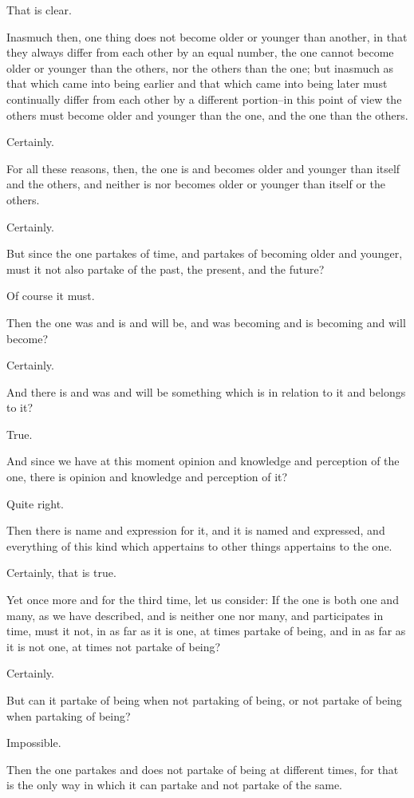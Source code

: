 That is clear.

Inasmuch then, one thing does not become older or younger than another,
in that they always differ from each other by an equal number, the one
cannot become older or younger than the others, nor the others than the
one; but inasmuch as that which came into being earlier and that which
came into being later must continually differ from each other by a
different portion--in this point of view the others must become older
and younger than the one, and the one than the others.

Certainly.

For all these reasons, then, the one is and becomes older and younger
than itself and the others, and neither is nor becomes older or younger
than itself or the others.

Certainly.

But since the one partakes of time, and partakes of becoming older and
younger, must it not also partake of the past, the present, and the
future?

Of course it must.

Then the one was and is and will be, and was becoming and is becoming
and will become?

Certainly.

And there is and was and will be something which is in relation to it
and belongs to it?

True.

And since we have at this moment opinion and knowledge and perception of
the one, there is opinion and knowledge and perception of it?

Quite right.

Then there is name and expression for it, and it is named and expressed,
and everything of this kind which appertains to other things appertains
to the one.

Certainly, that is true.

Yet once more and for the third time, let us consider: If the one is
both one and many, as we have described, and is neither one nor many,
and participates in time, must it not, in as far as it is one, at times
partake of being, and in as far as it is not one, at times not partake
of being?

Certainly.

But can it partake of being when not partaking of being, or not partake
of being when partaking of being?

Impossible.

Then the one partakes and does not partake of being at different times,
for that is the only way in which it can partake and not partake of the
same.

